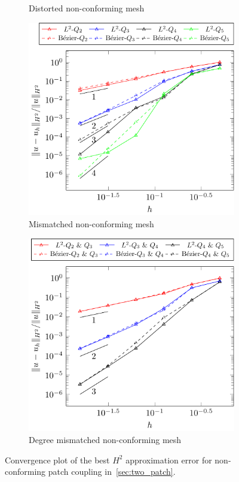\documentclass[preprint,12pt]{elsarticle}
\theoremstyle{remark}
\begin{document}
\begin{figure}[hbt]
\begin{subfigure}[b]{0.48\textwidth}
        \caption{Distorted non-conforming mesh}
        \vspace*{3mm}
    \end{subfigure}
    \begin{subfigure}[b]{0.48\textwidth}
        \includegraphics[width=\textwidth]{two_patch_biharmonic_nonmatch_H2}
        \caption{Mismatched non-conforming mesh}
    \end{subfigure}
    \begin{subfigure}[b]{0.48\textwidth}
        \includegraphics[width=\textwidth]{two_patch_biharmonic_diff_degree_H2}
        \caption{Degree mismatched non-conforming mesh}
    \end{subfigure}
	\caption{Convergence plot of the best $H^2$ approximation error for non-conforming patch coupling in~\ref{sec:two_patch}.}\label{fig:two_patch_best_approximation}
\end{figure}
\end{document}
